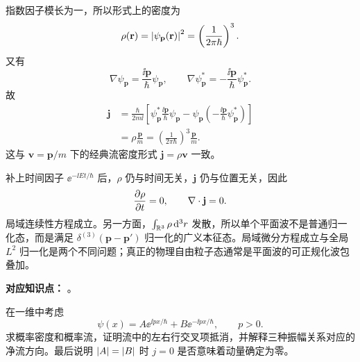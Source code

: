 \begin{checkedsolution}
指数因子模长为一，所以形式上的密度为
\begin{equation}
  \rho(\mathbf r)
  =\left|\psi_{\mathbf p}(\mathbf r)\right|^2
  =\left(\frac{1}{2\pi\hbar}\right)^3.
  \label{eq:QM-C05-S03-E03-density}
\end{equation}
又有
\begin{equation}
  \nabla\psi_{\mathbf p}
  =\frac{\ii\mathbf p}{\hbar}\psi_{\mathbf p},
  \qquad
  \nabla\psi_{\mathbf p}^*
  =-\frac{\ii\mathbf p}{\hbar}\psi_{\mathbf p}^*.
  \label{eq:QM-C05-S03-E03-gradients}
\end{equation}
故
\begin{align}
  \mathbf j
  &=\frac{\hbar}{2m\ii}
  \left[
    \psi_{\mathbf p}^*
    \frac{\ii\mathbf p}{\hbar}\psi_{\mathbf p}
    -\psi_{\mathbf p}
    \left(-\frac{\ii\mathbf p}{\hbar}\psi_{\mathbf p}^*\right)
  \right]\\
  &=\boxed{\rho\frac{\mathbf p}{m}}
  =\left(\frac{1}{2\pi\hbar}\right)^3\frac{\mathbf p}{m}.
  \label{eq:QM-C05-S03-E03-current}
\end{align}
这与 $\mathbf v=\mathbf p/m$ 下的经典流密度形式 $\mathbf j=\rho\mathbf v$ 一致。

补上时间因子 $\ee^{-\ii Et/\hbar}$ 后，$\rho$ 仍与时间无关，$\mathbf j$ 仍与位置无关，因此
\begin{equation}
  \frac{\partial \rho}{\partial t}=0,
  \qquad
  \nabla\cdot\mathbf j=0.
  \label{eq:QM-C05-S03-E03-local-continuity}
\end{equation}
局域连续性方程成立。另一方面，$\int_{\mathbb{R}^3}\rho\mathop{}\!\mathrm{d}^3r$ 发散，所以单个平面波不是普通归一化态，而是满足 $\delta^{(3)}(\mathbf p-\mathbf p')$ 归一化的广义本征态。局域微分方程成立与全局 $L^2$ 归一化是两个不同问题；真正的物理自由粒子态通常是平面波的可正规化波包叠加。
\end{checkedsolution}


\textbf{对应知识点：}
。

在一维中考虑
\begin{equation}
  \psi(x)=A\ee^{\ii px/\hbar}+B\ee^{-\ii px/\hbar},
  \qquad p>0.
  \label{eq:QM-C05-S03-E04-state}
\end{equation}
求概率密度和概率流，证明流中的左右行交叉项抵消，并解释三种振幅关系对应的净流方向。最后说明 $\left|A\right|=\left|B\right|$ 时 $j=0$ 是否意味着动量确定为零。

